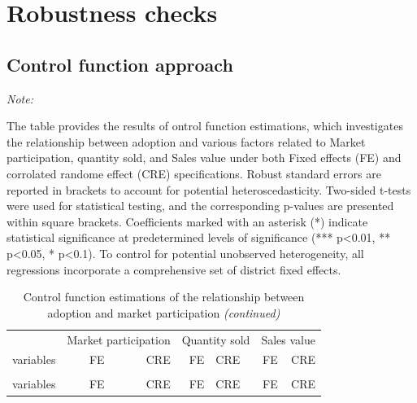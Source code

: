 \documentclass[
]{article}
\begin{document}
\hypertarget{robustness-checks}{%
\section{Robustness checks}\label{robustness-checks}}

\hypertarget{control-function-approach}{%
\subsection{Control function approach}\label{control-function-approach}}

\begingroup\fontsize{7}{9}\selectfont

\begin{ThreePartTable}
\begin{TableNotes}[para]
\item \textit{Note: } 
\item The table provides the results of ontrol function estimations, which investigates the relationship between adoption and various factors related to Market participation, quantity sold, and Sales value under both Fixed effects (FE) and corrolated randome effect (CRE) specifications. Robust standard errors are reported in brackets to account for potential heteroscedasticity. Two-sided t-tests were used for statistical testing, and the corresponding p-values are presented within square brackets. Coefficients marked with an asterisk (*) indicate statistical significance at predetermined levels of significance (*** p<0.01, ** p<0.05, * p<0.1). To control for potential unobserved heterogeneity, all regressions incorporate a comprehensive set of district fixed effects.
\end{TableNotes}
\begin{longtable}[t]{lrrrlrr}
\caption{\label{tab:unnamed-chunk-13}Control function estimations of the relationship between adoption and market participation}\\
\toprule
\multicolumn{1}{c}{ } & \multicolumn{2}{c}{Market participation} & \multicolumn{2}{c}{Quantity sold} & \multicolumn{2}{c}{Sales value} \\
\cmidrule(l{3pt}r{3pt}){2-3} \cmidrule(l{3pt}r{3pt}){4-5} \cmidrule(l{3pt}r{3pt}){6-7}
variables & FE & CRE & FE & CRE & FE & CRE\\
\midrule
\endfirsthead
\caption[]{\label{tab:unnamed-chunk-13}Control function estimations of the relationship between adoption and market participation \textit{(continued)}}\\
\toprule
variables & FE & CRE & FE & CRE & FE & CRE\\
\midrule
\endhead


\end{longtable}
\end{ThreePartTable}
\end{document}
